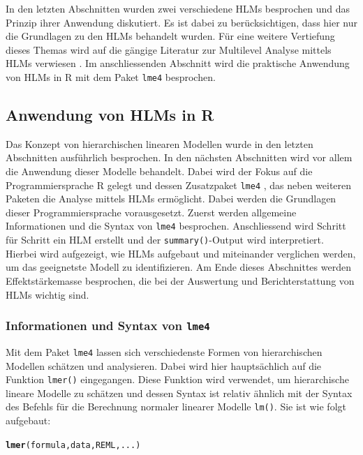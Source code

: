 \documentclass[12pt, a4paper]{article}\usepackage[]{graphicx}\usepackage[]{color}
\makeatletter
\newcommand{\hlstd}[1]{\textcolor[rgb]{0.345,0.345,0.345}{#1}}%
\newcommand{\hlkwd}[1]{\textcolor[rgb]{0.737,0.353,0.396}{\textbf{#1}}}%
\newenvironment{kframe}{%
 \def\at@end@of@kframe{}%
 \ifinner\ifhmode%
  \def\at@end@of@kframe{\end{minipage}}%
  \begin{minipage}{\columnwidth}%
 \fi\fi%
 \def\FrameCommand##1{\hskip\@totalleftmargin \hskip-\fboxsep
 \colorbox{shadecolor}{##1}\hskip-\fboxsep
     \hskip-\linewidth \hskip-\@totalleftmargin \hskip\columnwidth}%
 \MakeFramed {\advance\hsize-\width
   \@totalleftmargin\z@ \linewidth\hsize
   \@setminipage}}%
 {\par\unskip\endMakeFramed%
 \at@end@of@kframe}
\newenvironment{knitrout}{}{} %
\makeatother
\begin{document}
In den letzten Abschnitten wurden zwei verschiedene HLMs besprochen und das Prinzip ihrer Anwendung diskutiert. Es ist dabei zu berücksichtigen, dass hier nur die Grundlagen zu den HLMs behandelt wurden. Für eine weitere Vertiefung dieses Themas wird auf die gängige Literatur zur Multilevel Analyse mittels HLMs verwiesen \citep{andrew_data, raudenbush2002hierarchical, SnijdersTomA.B2012Ma:a, twisk_2006}. Im anschliessenden Abschnitt wird die praktische Anwendung von HLMs in R mit dem Paket \texttt{lme4} \citep{batesetal2015lme4} besprochen.

\subsection{Anwendung von HLMs in R} \label{section:ml_in_R}
Das Konzept von hierarchischen linearen Modellen wurde in den letzten Abschnitten ausführlich besprochen. In den nächsten Abschnitten wird vor allem die Anwendung dieser Modelle behandelt. Dabei wird der Fokus auf die Programmiersprache R gelegt und dessen Zusatzpaket \texttt{lme4} \citep{batesetal2015lme4}, das neben weiteren Paketen die Analyse mittels HLMs ermöglicht. Dabei werden die Grundlagen dieser Programmiersprache vorausgesetzt. Zuerst werden allgemeine Informationen und die Syntax von \texttt{lme4} besprochen. Anschliessend wird Schritt für Schritt ein HLM erstellt und der \texttt{summary()}-Output wird interpretiert. Hierbei wird aufgezeigt, wie HLMs aufgebaut und miteinander verglichen werden, um das geeignetste Modell zu identifizieren. Am Ende dieses Abschnittes werden Effektstärkemasse besprochen, die bei der Auswertung und Berichterstattung von HLMs wichtig sind.  

\subsubsection{Informationen und Syntax von \texttt{lme4}}
Mit dem Paket \texttt{lme4} lassen sich verschiedenste Formen von hierarchischen Modellen schätzen und analysieren. Dabei wird hier hauptsächlich auf die Funktion \texttt{lmer()} eingegangen. Diese Funktion wird verwendet, um hierarchische lineare Modelle zu schätzen und dessen Syntax ist relativ ähnlich mit der Syntax des Befehls für die Berechnung normaler linearer Modelle \texttt{lm()}. Sie ist wie folgt aufgebaut:

\begin{knitrout}
\color{fgcolor}\begin{kframe}
\begin{alltt}
\hlkwd{lmer}\hlstd{(formula, data, REML, ...)}
\end{alltt}
\end{kframe}
\end{knitrout}
\end{document}
